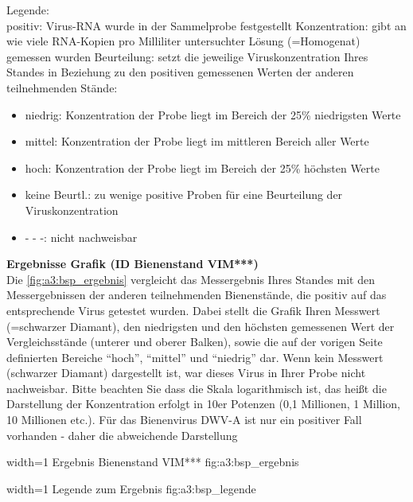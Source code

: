 


Legende:\\
positiv: Virus-RNA wurde in der Sammelprobe festgestellt
Konzentration: gibt an wie viele RNA-Kopien pro Milliliter untersuchter Lösung (=Homogenat)
gemessen wurden
Beurteilung: setzt die jeweilige Viruskonzentration Ihres Standes in Beziehung zu den positiven
gemessenen Werten der anderen teilnehmenden Stände:
\begin{itemize}
    \item niedrig: Konzentration der Probe liegt im Bereich der 25\% niedrigsten Werte
    \item mittel: Konzentration der Probe liegt im mittleren Bereich aller Werte
    \item hoch: Konzentration der Probe liegt im Bereich der 25\% höchsten Werte
    \item keine Beurtl.: zu wenige positive Proben für eine Beurteilung der Viruskonzentration
    \item - - -: nicht nachweisbar
\end{itemize}

\textbf{Ergebnisse Grafik (ID Bienenstand VIM***)}\\
Die \cref{fig:a3:bsp_ergebnis} vergleicht das Messergebnis Ihres Standes mit den Messergebnissen der anderen
teilnehmenden Bienenstände, die positiv auf das entsprechende Virus getestet wurden. Dabei stellt die Grafik Ihren Messwert (=schwarzer Diamant), den niedrigsten und den höchsten
gemessenen Wert der Vergleichsstände (unterer und oberer Balken), sowie die auf der vorigen
Seite definierten Bereiche “hoch”, “mittel” und “niedrig” dar. Wenn kein Messwert (schwarzer
Diamant) dargestellt ist, war dieses Virus in Ihrer Probe nicht nachweisbar. Bitte beachten Sie
dass die Skala logarithmisch ist, das heißt die Darstellung der Konzentration erfolgt in 10er
Potenzen (0,1 Millionen, 1 Million, 10 Millionen etc.). Für das Bienenvirus DWV-A ist nur ein
positiver Fall vorhanden - daher die abweichende Darstellung


  {width=1\textwidth} %
  {Ergebnis Bienenstand VIM***} %
  {} %
  {fig:a3:bsp_ergebnis} %
  
  {width=1\textwidth} %
  {Legende zum Ergebnis} %
  {} %
  {fig:a3:bsp_legende} %



